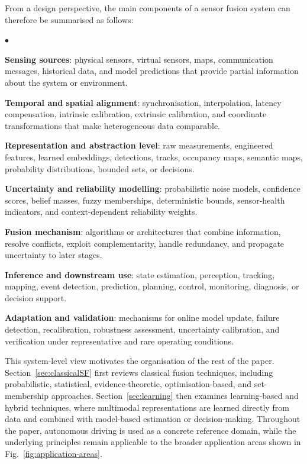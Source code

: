 \documentclass{ieeeaccess}
\newenvironment{list4a}{
  \begin{list}{$\bullet$}{%
      \setlength{\itemsep}{0.05cm}
      \setlength{\labelsep}{0.2cm}
      \setlength{\labelwidth}{0.3cm}
      \setlength{\parsep}{0in}
      \setlength{\parskip}{0in}
      \setlength{\topsep}{0in}
      \setlength{\partopsep}{0in}
      \setlength{\leftmargin}{0.16in}}}
      {\end{list}}
\begin{document}
From a design perspective, the main components of a sensor fusion system can therefore be summarised as follows:
\begin{list4a}
    \item \textbf{Sensing sources}: physical sensors, virtual sensors, maps, communication messages, historical data, and model predictions that provide partial information about the system or environment.
    \item \textbf{Temporal and spatial alignment}: synchronisation, interpolation, latency compensation, intrinsic calibration, extrinsic calibration, and coordinate transformations that make heterogeneous data comparable.
    \item \textbf{Representation and abstraction level}: raw measurements, engineered features, learned embeddings, detections, tracks, occupancy maps, semantic maps, probability distributions, bounded sets, or decisions.
    \item \textbf{Uncertainty and reliability modelling}: probabilistic noise models, confidence scores, belief masses, fuzzy memberships, deterministic bounds, sensor-health indicators, and context-dependent reliability weights.
    \item \textbf{Fusion mechanism}: algorithms or architectures that combine information, resolve conflicts, exploit complementarity, handle redundancy, and propagate uncertainty to later stages.
    \item \textbf{Inference and downstream use}: state estimation, perception, tracking, mapping, event detection, prediction, planning, control, monitoring, diagnosis, or decision support.
    \item \textbf{Adaptation and validation}: mechanisms for online model update, failure detection, recalibration, robustness assessment, uncertainty calibration, and verification under representative and rare operating conditions.
\end{list4a}

This system-level view motivates the organisation of the rest of the paper. Section~\ref{sec:classicalSF} first reviews classical fusion techniques, including probabilistic, statistical, evidence-theoretic, optimisation-based, and set-membership approaches. Section~\ref{sec:learning} then examines learning-based and hybrid techniques, where multimodal representations are learned directly from data and combined with model-based estimation or decision-making. Throughout the paper, autonomous driving is used as a concrete reference domain, while the underlying principles remain applicable to the broader application areas shown in Fig.~\ref{fig:application-areas}.
\end{document}

